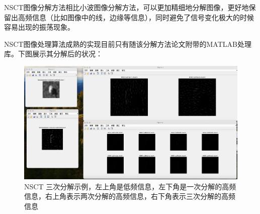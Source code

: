 \documentclass{xduugthesis}
\begin{document}
\begin{enumerate}
NSCT图像分解方法相比小波图像分解方法，可以更加精细地分解图像，更好地保留出高频信息（比如图像中的线，边缘等信息），同时避免了信号变化极大的时候容易出现的振荡现象。\par
NSCT图像处理算法成熟的实现目前只有随该分解方法论文附带的MATLAB处理库\cite{NSCT_MATLAB}。下图展示其分解后的状况：\par
\begin{figure}[h!]
	\centering
	\includegraphics[scale=0.2]{img/nsct_result.png}
	\caption{NSCT 三次分解示例，左上角是低频信息，左下角是一次分解的高频信息，右上角表示两次分解的高频信息，右下角表示三次分解的高频信息}
\end{figure}

\end{enumerate}
\end{document}

